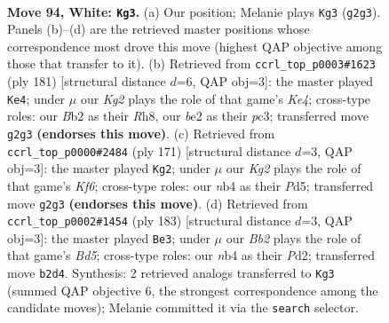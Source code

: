 \documentclass[11pt]{article}
\begin{document}
\clearpage

\begin{figure}[p]\centering
\begin{subfigure}{0.46\textwidth}\centering
\resizebox{\linewidth}{!}{%
\newchessgame
\chessboard[
  setfen={8/8/7k/8/1n6/8/1B2bPK1/8 w - - 33 94},
  showmover=false,
  pgfstyle=straightmove, color=movearrow, markmove={g2-g3}
]}
\caption{}
\end{subfigure}\hfill
\begin{subfigure}{0.46\textwidth}\centering
\resizebox{\linewidth}{!}{%
\newchessgame
\chessboard[
  setfen={7r/8/8/3pk3/8/2P5/2N1K3/8 b - - 91 91},
  showmover=false,
  pgfstyle=straightmove, color=movearrow, markmove={e5-e4}
]}
\caption{}
\end{subfigure}
\\[4pt]
\begin{subfigure}{0.46\textwidth}\centering
\resizebox{\linewidth}{!}{%
\newchessgame
\chessboard[
  setfen={8/B7/6b1/3p4/8/5kp1/8/4K3 b - - 5 86},
  showmover=false,
  pgfstyle=straightmove, color=movearrow, markmove={f3-g2}
]}
\caption{}
\end{subfigure}\hfill
\begin{subfigure}{0.46\textwidth}\centering
\resizebox{\linewidth}{!}{%
\newchessgame
\chessboard[
  setfen={8/5K2/7k/6p1/3b2B1/8/3p4/8 b - - 57 92},
  showmover=false,
  pgfstyle=straightmove, color=movearrow, markmove={d4-e3}
]}
\caption{}
\end{subfigure}
\caption{\textbf{Move 94, White: \texttt{Kg3}.} (a) Our position; Melanie plays \texttt{Kg3} (\texttt{g2g3}). Panels (b)--(d) are the retrieved master positions whose correspondence most drove this move (highest QAP objective among those that transfer to it). (b) Retrieved from \texttt{ccrl\_top\_p0003\#1623} (ply 181) [structural distance $d$=6, QAP obj=3]: the master played \texttt{Ke4}; under $\mu$ our \emph{Kg2} plays the role of that game's \emph{Ke4}; cross-type roles: our \emph{B}b2 as their \emph{R}h8, our \emph{b}e2 as their \emph{p}c3; transferred move \texttt{g2g3} \textbf{(endorses this move)}. (c) Retrieved from \texttt{ccrl\_top\_p0000\#2484} (ply 171) [structural distance $d$=3, QAP obj=3]: the master played \texttt{Kg2}; under $\mu$ our \emph{Kg2} plays the role of that game's \emph{Kf6}; cross-type roles: our \emph{n}b4 as their \emph{P}d5; transferred move \texttt{g2g3} \textbf{(endorses this move)}. (d) Retrieved from \texttt{ccrl\_top\_p0002\#1454} (ply 183) [structural distance $d$=3, QAP obj=3]: the master played \texttt{Be3}; under $\mu$ our \emph{Bb2} plays the role of that game's \emph{Bd5}; cross-type roles: our \emph{n}b4 as their \emph{P}d2; transferred move \texttt{b2d4}. Synthesis: 2 retrieved analogs transferred to \texttt{Kg3} (summed QAP objective 6, the strongest correspondence among the candidate moves); Melanie committed it via the \texttt{search} selector.}
\label{fig:thought-m186}
\end{figure}
\end{document}
